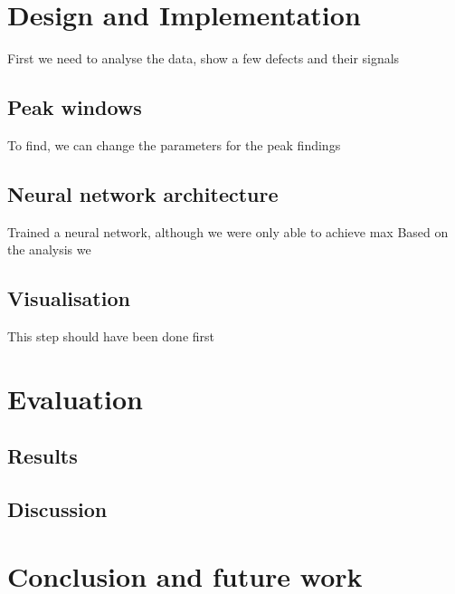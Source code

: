 \chapter{Design and Implementation}
First we need to analyse the data, show a few defects and their signals 


\section{Peak windows}
To find,
we can change the parameters for the peak findings
\section{Neural network architecture}

Trained a neural network, although we were only able to achieve max
Based on the analysis we

\section{Visualisation}
This step should have been done first

\chapter{Evaluation}
\section{Results}
\section{Discussion}

\chapter{Conclusion and future work}
